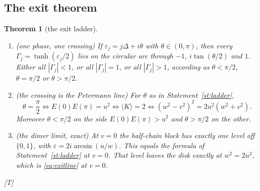 \documentclass[11pt]{article}
\newtheorem{theorem}{Theorem}[section]
\theoremstyle{definition}
\newcommand{\grade}[1]{\textsf{\small[#1]}}
\begin{document}
\subsection{The exit theorem}
\begin{theorem}[the exit ladder]\label{thm:exit}
\begin{enumerate}
\item[(a)] (one phase, one crossing) If $\varepsilon_j=j\Delta+i\theta$ with $\theta\in(0,\pi)$, then every $\Gamma_j=\tanh(\varepsilon_j/2)$ lies on the circular arc through $-1$, $i\tan(\theta/2)$ and $1$. Either all $|\Gamma_j|<1$, or all $|\Gamma_j|=1$, or all $|\Gamma_j|>1$, according as $\theta<\pi/2$, $\theta=\pi/2$ or $\theta>\pi/2$.
\item[(b)] (the crossing is the Petermann line) For $\theta$ as in Statement~\ref{st:ladder},
\[
\theta=\frac\pi2\iff E(0)E(\pi)=u^2\iff\langle K\rangle=2\iff(w^2-v^2)^2=2u^2(w^2+v^2).
\]
Moreover $\theta<\pi/2$ on the side $E(0)E(\pi)>u^2$ and $\theta>\pi/2$ on the other.
\item[(c)] (the dimer limit, exact) At $v=0$ the half-chain block has exactly one level off $\{0,1\}$, with $\varepsilon=2i\arcsin(u/w)$. This equals the formula of Statement~\ref{st:ladder} at $v=0$. That level leaves the disk exactly at $w^2=2u^2$, which is \eqref{eq:exitline} at $v=0$.
\end{enumerate}
\grade{T}
\end{theorem}
\end{document}

